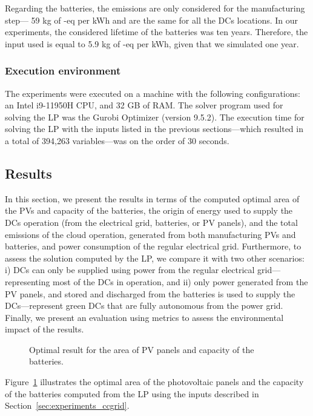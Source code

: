 Regarding the batteries, the emissions are only considered for the manufacturing step--- 59 kg of -eq per kWh and are the same for all the DCs locations. In our experiments, the considered lifetime of the batteries was ten years. Therefore, the input used is equal to 5.9 kg of -eq per kWh, given that we simulated one year.

\subsubsection{Execution environment}
 
The experiments were executed on a machine with the following configurations: an Intel i9-11950H CPU, and 32 GB of RAM. The solver program used for solving the LP was the Gurobi Optimizer (version 9.5.2). The execution time for solving the LP with the inputs listed in the previous sections---which resulted in a total of 394,263 variables---was on the order of 30 seconds.

\subsection{Results}
\label{sec:results_ccgrid}
In this section, we present the results in terms of the computed optimal area of the PVs and capacity of the batteries, the origin of energy used to supply the DCs operation (from the electrical grid, batteries, or PV panels), and the total emissions of the cloud operation, generated from both manufacturing PVs and batteries, and power consumption of the regular electrical grid. Furthermore, to assess the solution computed by the LP, we compare it with two other scenarios: i) DCs can only be supplied using power from the regular electrical grid---representing most of the DCs in operation, and ii) only power generated from the PV panels, and stored and discharged from the batteries is used to supply the DCs---represent green DCs that are fully autonomous from the power grid. Finally, we present an evaluation using metrics to assess the environmental impact of the results.

\begin{figure}[h]
  \centering
  {}
  \caption{Optimal result for the area of PV panels and capacity of the batteries.}
  \label{fig:sizing}
\end{figure}

Figure~\ref{fig:sizing} illustrates the optimal area of the photovoltaic panels and the capacity of the batteries computed from the LP using the inputs described in Section~\ref{sec:experiments_ccgrid}.

